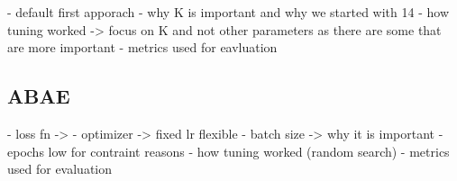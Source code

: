 - default first apporach
- why K is important and why we started with 14
- how tuning worked -> focus on K and not other parameters as there are some that are more important
- metrics used for eavluation

\subsection{ABAE}
- loss fn ->
- optimizer -> fixed lr flexible
- batch size -> why it is important
- epochs low for contraint reasons
- how tuning worked (random search)
- metrics used for evaluation
